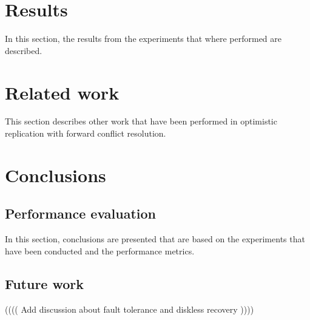 \documentclass[MSc, ida]{histhesis}
\begin{document}
\section{Results} %
\label{sec:results}

In this section, the results from the experiments that where performed are described. 

\section{Related work} %
\label{sec:future_work}

This section describes other work that have been performed in optimistic replication with forward conflict resolution.

\section{Conclusions} %
\label{sec:conclusion}


\subsection{Performance evaluation} %
\label{sub:performance_evaluation}

In this section, conclusions are presented that are based on the experiments that have been conducted and the performance metrics.

\subsection{Future work} %
\label{sub:future_work}

(((( Add discussion about fault tolerance and diskless recovery ))))

\newpage



\end{document}
